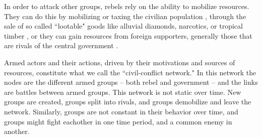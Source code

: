 In order to attack other groups, rebels rely on the ability to mobilize resources. They can do this by mobilizing or taxing the civilian population \citet{kalyvan:2006}, through the sale of so called ``lootable" goods like alluvial diamonds, narcotics, or tropical timber \citet{ross:2004, lujala:etal:2005, soysa:2000}, or they can gain resources from foreign supporters, generally those that are rivals of the central government \citet{gleditsch:2007, regan:2002, regan:2002a}.

Armed actors and their actions, driven by their motivations and sources of resources, constitute what we call the ``civil-conflict network." In this network the nodes are the different armed groups -- both rebel and government -- and the links are battles between armed groups. This network is not static over time. New groups are created, groups split into rivals, and groups demobilize and leave the network. Similarly, groups are not constant in their behavior over time, and groups might fight eachother in one time period, and a common enemy in another.




